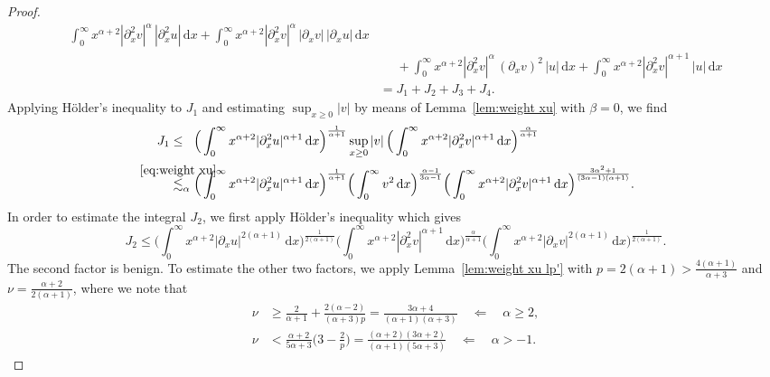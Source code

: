 \documentclass[10pt,a4paper]{amsart}
\renewcommand{\d}{\ensuremath{\mathrm{d}}}
\begin{document}
\begin{proof}
\begin{align}
    \int_0^\infty x^{\alpha+2} 
    |\partial_x^2 v|^\alpha\, |\partial_x^2 u|\, \d x 
    + 
    \int_0^\infty x^{\alpha+2} 
    |\partial_x^2 v|^\alpha\, |\partial_x v|\, |\partial_x u|\, \d x 
    \nonumber\\
    & \phantom{=} 
    +
    \int_0^\infty x^{\alpha+2} |\partial_x^2 v|^\alpha\, (\partial_x v)^2\, |u|\, \d x
    + 
    \int_0^\infty x^{\alpha+2} |\partial_x^2 v|^{\alpha+1}\, |u|\, \d x
    \nonumber\\
    &=
    J_1 + J_2 + J_3 + J_4. \label{eq:N(v)u_J_i}
\end{align}
%
Applying H\"older's inequality to $J_1$ and estimating $\sup_{x\geq 0} |v|$ by means of Lemma~\ref{lem:weight xu} with $\beta=0$, we find
%
\begin{align}\nonumber
    J_1 
    &\leq_{\phantom{\alpha}} 
    \Big(\int_0^\infty x^{\alpha+2} |\partial_x^2 u|^{\alpha+1}\, \d x\Big)^\frac{1}{\alpha+1} \sup_{x \geq 0} |v|\, \Big(\int_0^\infty x^{\alpha+2} |\partial_x^2 v|^{\alpha+1}\, \d x\Big)^\frac{\alpha}{\alpha+1}
    \\
    &\stackrel{\mathclap{\eqref{eq:weight xu}}}{\lesssim}_\alpha 
    \Big(\int_0^\infty x^{\alpha+2} |\partial_x^2 u|^{\alpha+1}\, \d x\Big)^\frac{1}{\alpha+1}
    \Big(\int_0^\infty v^2\, \d x\Big)^\frac{\alpha-1}{3\alpha-1}
    \Big(\int_0^\infty x^{\alpha+2} |\partial_x^2 v|^{\alpha+1}\, \d x\Big)^\frac{3\alpha^2+1}{(3\alpha-1)(\alpha+1)}. \label{eq:N(v)u_J1}
\end{align}
%
In order to estimate the integral $J_2$, we first apply H\"older's inequality which gives
%
\begin{equation*}
    J_2
    \leq
    \Big(\int_0^\infty x^{\alpha+2} |\partial_x u|^{2(\alpha+1)}\, \d x\Big)^\frac{1}{2(\alpha+1)}
    \Big(\int_0^\infty x^{\alpha+2} |\partial_x^2 v|^{\alpha+1}\, \d x\Big)^\frac{\alpha}{\alpha+1} 
    \Big(\int_0^\infty x^{\alpha+2} |\partial_x v|^{2(\alpha+1)}\, \d x\Big)^\frac{1}{2(\alpha+1)}.
\end{equation*}
%
The second factor is benign. To estimate the other two factors, we apply Lemma~\ref{lem:weight xu lp'} with $p = 2(\alpha+1) > \frac{4(\alpha+1)}{\alpha+3}$ and $\nu = \frac{\alpha+2}{2(\alpha+1)}$, where we note that
%
\begin{align*}
\nu &\ge \frac{2}{\alpha+1} + \frac{2(\alpha-2)}{(\alpha+3)p} = \frac{3\alpha+4}{(\alpha+1)(\alpha+3)} \quad \Longleftarrow \quad \alpha \ge 2, \\
\nu &< \frac{\alpha+2}{5\alpha+3} \big(3-\tfrac 2 p\big) = \frac{(\alpha+2)(3\alpha+2)}{(\alpha+1)(5\alpha+3)} \quad \Longleftarrow \quad \alpha > -1.

\end{align*}
\end{proof}
\end{document}
